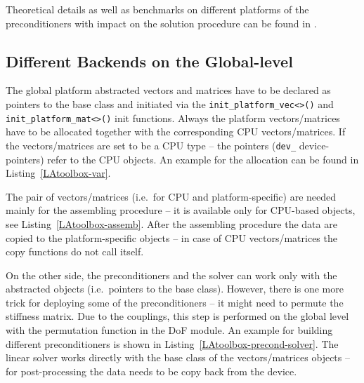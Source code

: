 \documentclass[a4paper, 11pt, twoside]{article}
\begin{document}
Theoretical details as well as benchmarks on different platforms of the
preconditioners with impact on the solution procedure can be found in
\cite{Lukarski2012}. 

\subsection{Different Backends on the Global-level}

The global platform abstracted vectors and matrices have to be declared as
pointers to the base class and initiated via the \verb'init_platform_vec<>()' and
\verb'init_platform_mat<>()' init functions. Always the platform
vectors/matrices have to be allocated together with the corresponding CPU
vectors/matrices.  If the vectors/matrices are set to be a CPU type -- the
pointers (\verb'dev_' device-pointers) refer to the CPU objects. An example
for the allocation can be found in Listing~\ref{LAtoolbox-var}.



The pair of vectors/matrices (i.e.~for CPU and platform-specific) are needed
mainly for the assembling procedure -- it is available only for CPU-based
objects, see Listing~\ref{LAtoolbox-assemb}. After the assembling procedure
the data are copied to the platform-specific objects -- in case of CPU
vectors/matrices the copy functions do not call itself.



On the other side, the preconditioners and the solver can work only with the
abstracted objects (i.e.~pointers to the base class). However, there is one
more trick for deploying some of the preconditioners -- it might need to
permute the stiffness matrix. Due to the couplings, this step is performed on
the global level with the permutation function in the DoF module. An example
for building different preconditioners is shown in
Listing~\ref{LAtoolbox-precond-solver}. The linear solver works directly with
the base class of the vectors/matrices objects -- for post-processing the data
needs to be copy back from the device. 

 
\end{document}
